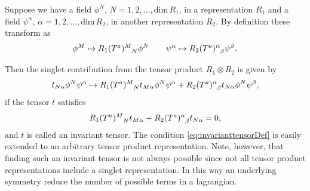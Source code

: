 Suppose we have a field $\phi^N$, $N=1,2,\ldots,\text{dim}\,R_1$, in a representation $R_1$ and a field $\psi^\alpha$, $\alpha=1,2,\ldots,\text{dim}\,R_2$, in another representation $R_2$. By definition these transform as 
\begin{equation}
    \phi^M \mapsto \tensor{R_1(T^a)}{^M_N}\phi^N \qquad \psi^\alpha\mapsto \tensor{R_2(T^a)}{^\alpha_\beta}\psi^\beta.
\end{equation}

Then the singlet contribution from the tensor product $R_1\otimes R_2$ is given by 
\begin{equation}
    t_{N\alpha}\phi^N\psi^\alpha \mapsto \tensor{R_1(T^a)}{^M_N}t_{M\alpha}\phi^N\psi^\alpha+\tensor{R_2(T^a)}{^\alpha_\beta}t_{N\alpha}\phi^N\psi^\beta ,
\end{equation}
if the tensor $t$ satisfies
\begin{equation}\label{eq:invarianttensorDef}
    \tensor{R_1(T^a)}{^M_N}t_{M\alpha}+\tensor{R_2(T^a)}{^\alpha_\beta}t_{N\alpha} = 0,
\end{equation}
and $t$ is called an invariant tensor. The condition \eqref{eq:invarianttensorDef} is easily extended to an arbitrary tensor product representation. Note, however, that finding such an invariant tensor is not always possible since not all tensor product representations include a singlet representation. In this way an underlying symmetry reduce the number of possible terms in a lagrangian. 

